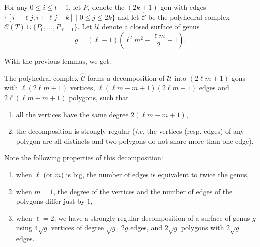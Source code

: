 \documentclass[12pt]{amsart}
\begin{document}
For any $0\le i\le l-1$, let $P_i$ denote the $(2k+1)$-gon with edges $\{[i+\ell j,i+\ell j+k]\;|\; 0\le j\le 2k\}$ and let $\hat{\mathcal{C}}$ be the polyhedral complex $\mathcal{C}(T)\cup\{P_0,\ldots,P_{\ell-1}\}$.
Let $\mathcal{U}$ denote a closed surface of genus $$g=(\ell-1)(\ell^2m^2-\frac{\ell m}{2}-1).$$

With the previous lemmas, we get:

\begin{corollary}
The polyhedral complex $\hat{\mathcal{C}}$ forms a decomposition of $\mathcal{U}$ into $(2\ell m+1)$-gons with $\ell(2\ell m+1)$ vertices, $\ell(\ell m-m+1)(2\ell m+1)$ edges and $2\ell(\ell m-m+1)$ polygons, such that
\begin{enumerate}
\item all the vertices have the same degree $2(\ell m-m+1)$,
\item the decomposition is strongly regular ({\it i.e.} the vertices (resp. edges) of any polygon are all distincts and two polygons do not share more than one edge).
\end{enumerate}
\end{corollary}


\begin{remark}
Note the following properties of this decomposition:
\begin{enumerate}
\item when $\ell$ (or $m$) is big, the number of edges is equivalent to twice the genus,
\item when $m=1$, the degree of the vertices and the number of edges of the polygons differ just by $1$,
\item when $\ell=2$, we have a strongly regular decomposition of a surface of genus $g$ using $4\sqrt{g}$ vertices of degree $\sqrt{g}$, $2g$ edges, and $2\sqrt{g}$ polygons with $2\sqrt{g}$ edges.
\end{enumerate}
\end{remark}


\nocite{dkm-lahp-02}
\nocite{n-gdfcp-00}
\nocite{j-gtdfssp-05}
\nocite{j-gt}
\nocite{e-btdp-06}



\end{document}
